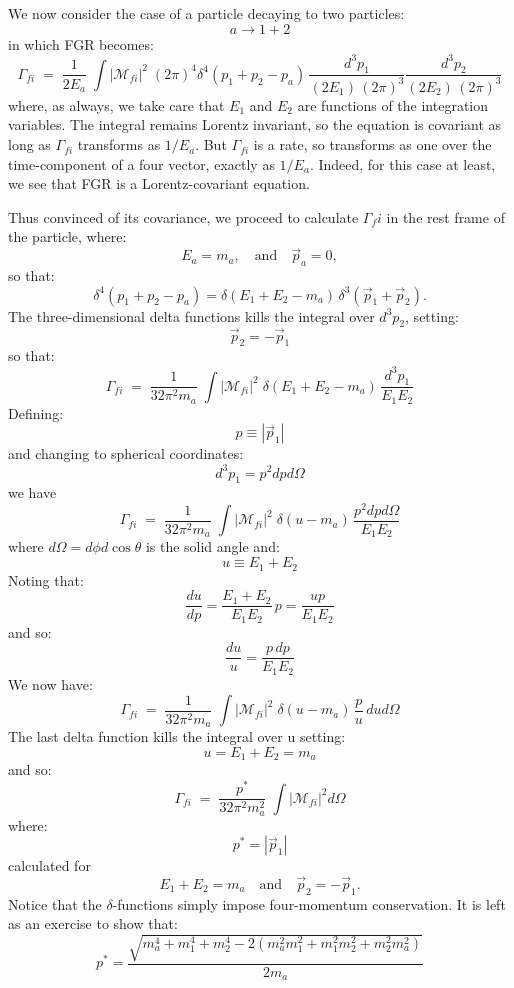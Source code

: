 \documentclass[12pt]{article}
\begin{document}
We now consider the case of a particle decaying to two particles:
$$a \to 1 + 2$$
in which FGR becomes:
\begin{equation}
\label{eqn:fgr-two-body-decay}
\Gamma_{fi} \; = \; \frac{1}{2 E_a} \; \int |\mathcal{M}_{fi}|^2 \; (2\pi)^4 \delta^4(p_1 + p_2 - p_a)
\, \frac{d^3p_1}{(2 E_1) \, (2\pi)^3 } \frac{d^3p_2}{(2 E_2) \, (2\pi)^3 }
\end{equation}
where, as always, we take care that $E_1$ and $E_2$ are functions of
the integration variables.  The integral remains Lorentz invariant, so
the equation is covariant as long as $\Gamma_{fi}$ transforms as
$1/E_a$.  But $\Gamma_{fi}$ is a rate, so transforms as one over the
time-component of a four vector, exactly as $1/E_a$.  Indeed, for this
case at least, we see that FGR is a Lorentz-covariant equation.

Thus convinced of its covariance, we proceed to calculate $\Gamma_fi$ in the rest frame of the particle, where:
$$ E_a = m_a,  \quad \text{and} \quad \vec p_a = 0, $$
so that:
$$\delta^4(p_1 + p_2 - p_a) = \delta(E_1+E_2 - m_a) \, \delta^3(\vec{p}_1+\vec{p}_2).$$
The three-dimensional delta functions kills the integral over $d^3 p_2$, setting:
$$\vec{p}_2 = -\vec{p}_1$$
so that:
$$\Gamma_{fi} \; = \; \frac{1}{32 \pi^2 m_a} \; \int |\mathcal{M}_{fi}|^2 \; \delta(E_1 + E_2 - m_a)
\, \frac{d^3p_1}{E_1 E_2}$$
Defining:
$$p \equiv |\vec{p}_1|$$
and changing to spherical coordinates:
$$d^3 p_1 = p^2 dp d\Omega$$
we have
$$\Gamma_{fi} \; = \; \frac{1}{32 \pi^2 m_a} \; \int |\mathcal{M}_{fi}|^2 \; \delta(u - m_a)
\, \frac{p^2 dp d\Omega}{E_1 E_2}$$
where $d\Omega = d\phi d\cos\theta$ is the solid angle and:
$$u \equiv E_1 + E_2$$
Noting that:
$$\frac{du}{dp} = \frac{E_1 + E_2}{E_1 E_2} \, p = \frac{up}{E_1 E_2}$$
and so:
$$\frac{du}{u} = \frac{p\, dp}{E_1 E_2}$$
We now have:
$$\Gamma_{fi} \; = \; \frac{1}{32 \pi^2 m_a} \; \int |\mathcal{M}_{fi}|^2 \; \delta(u - m_a) \, \frac{p}{u}\, du d\Omega$$
The last delta function kills the integral over u setting:
$$u = E_1 + E_2 = m_a$$
and so:
$$
\Gamma_{fi} \; = \; \frac{p^*}{32 \pi^2 m_a^2} \; \int |\mathcal{M}_{fi}|^2  d\Omega$$
where:
$$p^* = |\vec{p}_1|$$
calculated for
$$E_1 + E_2 = m_a \quad \text{and} \quad \vec{p}_2 = -\vec{p}_1.$$
Notice that the $\delta$-functions simply impose four-momentum
conservation.  It is left as an exercise to show that:
\begin{equation}
\label{eqn:pstar}
p^* = \frac{\sqrt{m_a^4 + m_1^4 + m_2^4- 2 (m_a^2 m_1^2 + m_1^2 m_2^2 + m_2^2 m_a^2)}}{2 m_a}
\end{equation}
\end{document}
